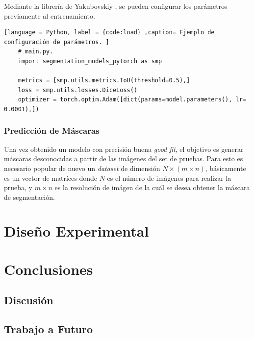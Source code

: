 Mediante la librería de Yakubovskiy \citep{Yakubovskiy:2019}, se pueden configurar los parámetros previamente al entrenamiento.

\begin{lstlisting}[language = Python, label = {code:load} ,caption= Ejemplo de configuración de parámetros. ]
    # main.py.
    import segmentation_models_pytorch as smp 

    metrics = [smp.utils.metrics.IoU(threshold=0.5),]
    loss = smp.utils.losses.DiceLoss()
    optimizer = torch.optim.Adam([dict(params=model.parameters(), lr= 0.0001),])
\end{lstlisting}

\subsection{Predicción de Máscaras} 
Una vez obtenido un modelo con precisión buena \emph{good fit}, el objetivo es generar máscaras desconocidas a partír de las imágenes del set de pruebas. Para esto es necesario popular de nuevo un \emph{dataset} de dimensión $N \times (m \times n)$, básicamente es un vector de matríces donde $N$ es el número de imágenes para realizar la prueba, y $m \times n$ es la resolución de imágen de la cuál se desea obtener la máscara de segmentación.

\chapter{Diseño Experimental}

\chapter{Conclusiones}

\section{Discusión}

\section{Trabajo a Futuro}

\nocite{*}